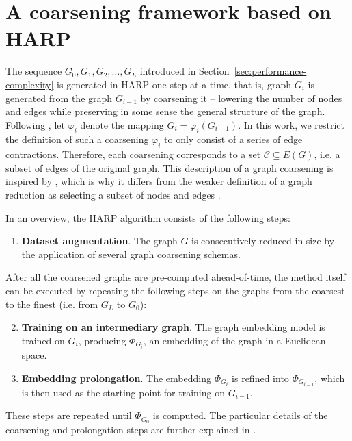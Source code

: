 \section{A coarsening framework based on HARP}\label{sec:harp}

The sequence \( G_0, G_1, G_2, \dots, G_L \) introduced in Section~\ref{sec:performance-complexity} is generated in HARP one step at a time, that is, graph \( G_i \) is generated from the graph \( G_{i - 1} \) by coarsening it -- lowering the number of nodes and edges while preserving in some sense the general structure of the graph. Following \cite{chen_harp_2018}, let \( \varphi_i \) denote the mapping \( G_i = \varphi_i \left( G_{i - 1} \right) \). In this work, we restrict the definition of such a coarsening \( \varphi_i \) to only consist of a series of edge contractions. Therefore, each coarsening corresponds to a set \( \mathcal{C} \subseteq E \left( G \right) \), i.e. a subset of edges of the original graph. This description of a graph coarsening is inspired by \cite{schulz_mining_2019}, which is why it differs from the weaker definition of a graph reduction as selecting a subset of nodes and edges \cite{huang_scaling_2021,loukas_graph_2019}.

In an overview, the HARP algorithm consists of the following steps:

\begin{enumerate}
  \item \textbf{Dataset augmentation}. The graph \( G \) is consecutively reduced in size by the application of several graph coarsening schemas.
\end{enumerate}
After all the coarsened graphs are pre-computed ahead-of-time, the method itself can be executed by repeating the following steps on the graphs from the coarsest to the finest (i.e. from \( G_L \) to \( G_0 \)):
\begin{enumerate}\setcounter{enumi}{1}
  \item \textbf{Training on an intermediary graph}. The graph embedding model is trained on \( G_i \), producing \( \Phi_{G_i} \), an embedding of the graph in a Euclidean space.
  \item \textbf{Embedding prolongation}. The embedding \( \Phi_{G_i} \) is refined into \( \Phi_{G_{i - 1}} \), which is then used as the starting point for training on \( G_{i - 1} \).
\end{enumerate}
These steps are repeated until \( \Phi_{G_0} \) is computed. The particular details of the coarsening and prolongation steps are further explained in \cite{chen_harp_2018}.
